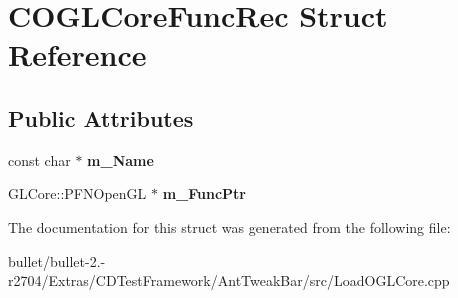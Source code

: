 \hypertarget{struct_c_o_g_l_core_func_rec}{\section{C\+O\+G\+L\+Core\+Func\+Rec Struct Reference}
\label{struct_c_o_g_l_core_func_rec}
}
\subsection*{Public Attributes}
\begin{DoxyCompactItemize}
\item 
\hypertarget{struct_c_o_g_l_core_func_rec_ae99ab9583408f3dd8f9940aa019f26c4}{const char $\ast$ {\bfseries m\+\_\+\+Name}}\label{struct_c_o_g_l_core_func_rec_ae99ab9583408f3dd8f9940aa019f26c4}

\item 
\hypertarget{struct_c_o_g_l_core_func_rec_a804fa007131eb8d24a759f38d728b506}{G\+L\+Core\+::\+P\+F\+N\+Open\+G\+L $\ast$ {\bfseries m\+\_\+\+Func\+Ptr}}\label{struct_c_o_g_l_core_func_rec_a804fa007131eb8d24a759f38d728b506}

\end{DoxyCompactItemize}


The documentation for this struct was generated from the following file\+:\begin{DoxyCompactItemize}
\item 
bullet/bullet-\/2.-\/r2704/\+Extras/\+C\+D\+Test\+Framework/\+Ant\+Tweak\+Bar/src/Load\+O\+G\+L\+Core.\+cpp\end{DoxyCompactItemize}

